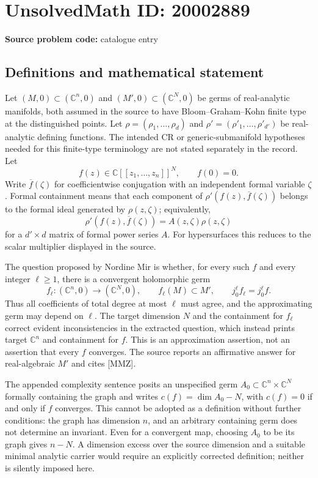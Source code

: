 \documentclass[11pt]{article}
\newcommand{\C}{\mathbb{C}}
\begin{document}
\section*{UnsolvedMath ID: 20002889}
\textbf{Source problem code:} catalogue entry
\subsection{Definitions and mathematical statement}
Let $(M,0)\subset(\C^n,0)$ and $(M',0)\subset(\C^N,0)$ be germs of real-analytic manifolds, both assumed in the source to have Bloom--Graham--Kohn finite type at the distinguished points. Let $\rho=(\rho_1,\ldots,\rho_d)$ and $\rho'=(\rho'_1,\ldots,\rho'_{d'})$ be real-analytic defining functions. The intended CR or generic-submanifold hypotheses needed for this finite-type terminology are not stated separately in the record. Let
\[
 f(z)\in\C[[z_1,\ldots,z_n]]^N,\qquad f(0)=0.
\]
Write $\overline f(\zeta)$ for coefficientwise conjugation with an independent formal variable $\zeta$. Formal containment means that each component of $\rho'(f(z),\overline f(\zeta))$ belongs to the formal ideal generated by $\rho(z,\zeta)$; equivalently,
\[
 \rho'(f(z),\overline f(\zeta))=A(z,\zeta)\rho(z,\zeta)
\]
for a $d'\times d$ matrix of formal power series $A$. For hypersurfaces this reduces to the scalar multiplier displayed in the source.

The question proposed by Nordine Mir is whether, for every such $f$ and every integer $\ell\geq1$, there is a convergent holomorphic germ
\[
 f_\ell:(\C^n,0)\longrightarrow(\C^N,0),\qquad
 f_\ell(M)\subset M',\qquad j_0^\ell f_\ell=j_0^\ell f.
\]
Thus all coefficients of total degree at most $\ell$ must agree, and the approximating germ may depend on $\ell$. The target dimension $N$ and the containment for $f_\ell$ correct evident inconsistencies in the extracted question, which instead prints target $\C^n$ and containment for $f$. This is an approximation assertion, not an assertion that every $f$ converges. The source reports an affirmative answer for real-algebraic $M'$ and cites [MMZ].

The appended complexity sentence posits an unspecified germ $A_0\subset\C^n\times\C^N$ formally containing the graph and writes $c(f)=\dim A_0-N$, with $c(f)=0$ if and only if $f$ converges. This cannot be adopted as a definition without further conditions: the graph has dimension $n$, and an arbitrary containing germ does not determine an invariant. Even for a convergent map, choosing $A_0$ to be its graph gives $n-N$. A dimension excess over the source dimension and a suitable minimal analytic carrier would require an explicitly corrected definition; neither is silently imposed here.
\end{document}
